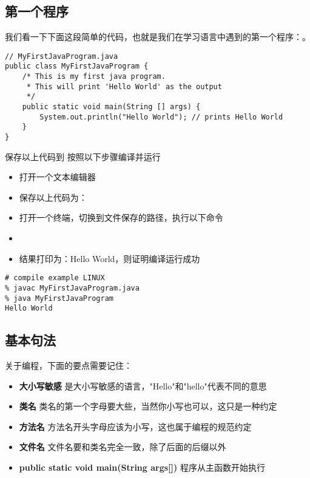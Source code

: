 \documentclass{article}
\begin{document}
\subsection{第一个程序}
我们看一下下面这段简单的代码，也就是我们在学习语言中遇到的第一个程序：。

\begin{verbatim}
// MyFirstJavaProgram.java
public class MyFirstJavaProgram {
	/* This is my first java program.
	 * This will print 'Hello World' as the output
	 */
	public static void main(String [] args) {
		System.out.println("Hello World"); // prints Hello World
	}
}
\end{verbatim}

保存以上代码到 按照以下步骤编译并运行
\begin{itemize}
\item 打开一个文本编辑器
\item 保存以上代码为：
\item 打开一个终端，切换到文件保存的路径，执行以下命令
\item {}
\item {} 结果打印为：Hello World，则证明编译运行成功
\end{itemize}

\begin{verbatim}
# compile example LINUX
% javac MyFirstJavaProgram.java
% java MyFirstJavaProgram
Hello World
\end{verbatim}

\subsection{基本句法}
关于编程，下面的要点需要记住：
\begin{itemize}
\item {\bf 大小写敏感} 是大小写敏感的语言，"Hello"和"hello"代表不同的意思
\item {\bf 类名} 类名的第一个字母要大些，当然你小写也可以，这只是一种约定
\item {\bf 方法名} 方法名开头字母应该为小写，这也属于编程的规范约定
\item {\bf 文件名} 文件名要和类名完全一致，除了后面的后缀以外
\item {\bf public static void main(String args[])}  程序从主函数开始执行
\end{itemize}
\end{document}

